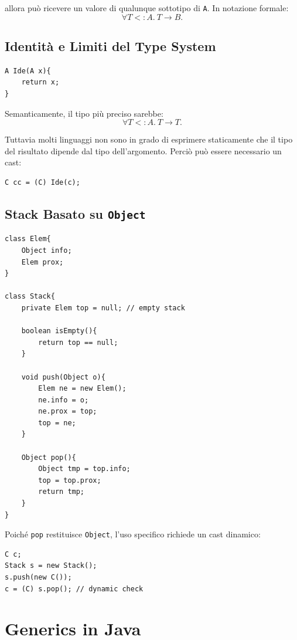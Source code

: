 \documentclass{article}
\begin{document}
allora può ricevere un valore di qualunque sottotipo di \texttt{A}. In notazione formale:
\[
\forall T <: A.\ T \to B.
\]

\subsection{Identità e Limiti del Type System}

\begin{lstlisting}
A Ide(A x){
    return x;
}
\end{lstlisting}

Semanticamente, il tipo più preciso sarebbe:
\[
\forall T <: A.\ T \to T.
\]

Tuttavia molti linguaggi non sono in grado di esprimere staticamente che il tipo del risultato dipende dal tipo dell'argomento. Perciò può essere necessario un cast:

\begin{lstlisting}
C cc = (C) Ide(c);
\end{lstlisting}

\subsection{Stack Basato su \texttt{Object}}

\begin{lstlisting}
class Elem{
    Object info;
    Elem prox;
}

class Stack{
    private Elem top = null; // empty stack

    boolean isEmpty(){
        return top == null;
    }

    void push(Object o){
        Elem ne = new Elem();
        ne.info = o;
        ne.prox = top;
        top = ne;
    }

    Object pop(){
        Object tmp = top.info;
        top = top.prox;
        return tmp;
    }
}
\end{lstlisting}

Poiché \texttt{pop} restituisce \texttt{Object}, l'uso specifico richiede un cast dinamico:

\begin{lstlisting}
C c;
Stack s = new Stack();
s.push(new C());
c = (C) s.pop(); // dynamic check
\end{lstlisting}

\section{Generics in Java}
\end{document}
